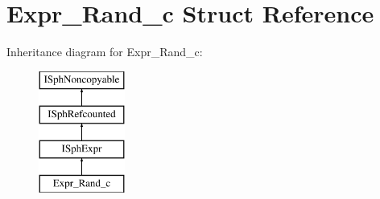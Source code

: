 \hypertarget{structExpr__Rand__c}{\section{Expr\-\_\-\-Rand\-\_\-c Struct Reference}
\label{structExpr__Rand__c}
}
Inheritance diagram for Expr\-\_\-\-Rand\-\_\-c\-:\begin{figure}[H]
\begin{center}
\leavevmode
\includegraphics[height=4.000000cm]{structExpr__Rand__c}
\end{center}
\end{figure}
